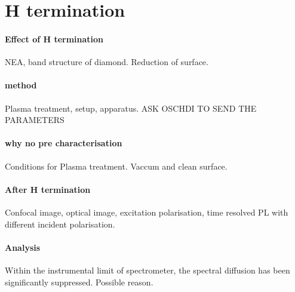
\section[H termination]{H termination}
\paragraph{Effect of H termination}

NEA, band structure of diamond. Reduction of surface.
\paragraph{method} Plasma treatment, setup, apparatus.
ASK OSCHDI TO SEND THE PARAMETERS

\paragraph{why no pre characterisation} Conditions for Plasma treatment.
Vaccum and clean surface.
\paragraph{After H termination} Confocal image, optical image, excitation polarisation, time resolved PL with different incident polarisation.

\paragraph{Analysis} Within the instrumental limit of spectrometer, the spectral diffusion has been significantly suppressed. Possible reason.